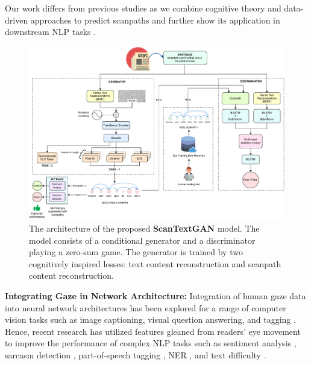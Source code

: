 Our work differs from previous studies as we combine cognitive theory and data-driven approaches to predict scanpaths and further show its application in downstream NLP tasks \cite{hollenstein-etal-2021-multilingual,hollenstein-etal-2021-cmcl}.

\begin{figure}[!t]
    \centering
    \includegraphics[width=\textwidth]{images/scanpath_model_6.pdf}
    \caption{The architecture of the proposed \textbf{ScanTextGAN} model. The model consists of a conditional generator and a discriminator playing a zero-sum game. The generator is trained by two cognitively inspired losses: text content reconstruction and scanpath content reconstruction.}
    \label{fig:model} 
\end{figure}

\textbf{Integrating Gaze in Network Architecture:} Integration of human gaze data into neural network architectures has been explored for a range of computer vision tasks such as image captioning, visual question answering, and tagging \cite{karessli2017gaze,yu2017supervising,he2019human,boyd2022human}. %
Hence, recent research has utilized features gleaned from readers' eye movement to improve the performance of complex NLP tasks such as sentiment analysis \cite{long-etal-2017-cognition, mishra-etal-2016-leveraging}, sarcasm detection \cite{mishra-etal-2016-harnessing}, part-of-speech tagging \cite{barrett-etal-2016-cross}, NER \cite{hollenstein-zhang-2019-entity}, and text difficulty \cite{ScanPathApp1}.

